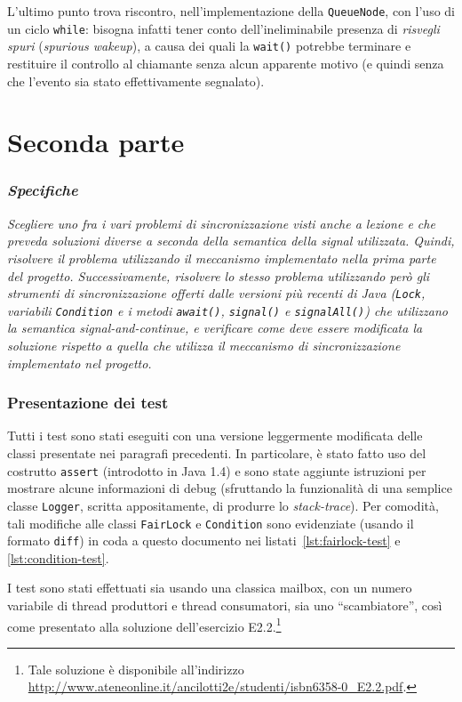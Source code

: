 \documentclass[a4paper,twoside]{article}
\newcommand\code{\lstinline[basicstyle=\normalsize\ttfamily]}
\begin{document}
L'ultimo punto trova riscontro, nell'implementazione della \code|QueueNode|, con l'uso di un ciclo \code|while|: bisogna infatti tener conto dell'ineliminabile presenza di \emph{risvegli spuri} (\emph{spurious wakeup}), a causa dei quali la \code|wait()| potrebbe terminare e restituire il controllo al chiamante senza alcun apparente motivo (e quindi senza che l'evento sia stato effettivamente segnalato).


\part*{Seconda parte}
\section{\textsl{Specifiche}}

\begingroup
\slshape
Scegliere uno fra i vari problemi di sincronizzazione visti anche a lezione e che preveda soluzioni diverse a seconda della semantica della signal utilizzata. Quindi, risolvere il problema utilizzando il meccanismo implementato nella prima parte del progetto. Successivamente, risolvere lo stesso problema utilizzando però gli strumenti di sincronizzazione offerti dalle versioni più recenti di Java (\code|Lock|, variabili \code|Condition| e i metodi \code|await()|, \code|signal()| e \code|signalAll()|) che utilizzano la semantica \emph{signal-and-continue}, e verificare come deve essere modificata la soluzione rispetto a quella che utilizza il meccanismo di sincronizzazione implementato nel progetto.
\endgroup


\section{Presentazione dei test}

Tutti i test sono stati eseguiti con una versione leggermente modificata delle classi presentate nei paragrafi precedenti. In particolare, è stato fatto uso del costrutto \code|assert| (introdotto in Java 1.4) e sono state aggiunte istruzioni per mostrare alcune informazioni di debug (sfruttando la funzionalità di una semplice classe \code|Logger|, scritta appositamente, di produrre lo \emph{stack-trace}). Per comodità, tali modifiche alle classi \code|FairLock| e \code|Condition| sono evidenziate (usando il formato \texttt{diff}) in coda a questo documento nei listati~\ref{lst:fairlock-test} e \ref{lst:condition-test}.

I test sono stati effettuati sia usando una classica mailbox, con un numero variabile di thread produttori e thread consumatori, sia uno “scambiatore”, così come presentato alla soluzione dell'esercizio E2.2.\footnote{Tale soluzione è disponibile all'indirizzo \url{http://www.ateneonline.it/ancilotti2e/studenti/isbn6358-0_E2.2.pdf}.}
\end{document}
